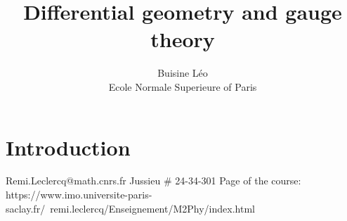 \documentclass[a4paper]{book}
\theoremstyle{definition}
\theoremstyle{remark}
\begin{document}
\title{Differential geometry and gauge theory}
\author{Buisine Léo\\Ecole Normale Superieure of Paris}
\maketitle

\tableofcontents

\chapter{Introduction}
Remi.Leclercq@math.cnrs.fr \newline 
Jussieu # 24-34-301 \newline
Page of the course: https://www.imo.universite-paris-saclay.fr/~remi.leclercq/Enseignement/M2Phy/index.html
\end{document}
